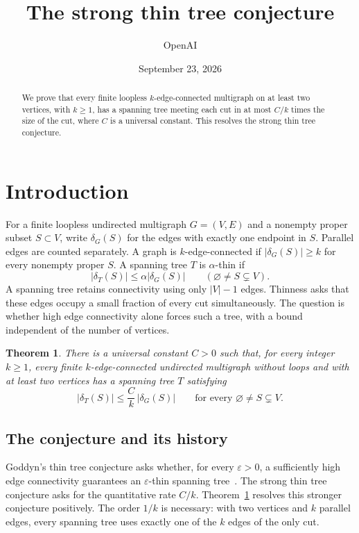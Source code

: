 \documentclass[11pt]{amsart}
\title{The strong thin tree conjecture}
\author{OpenAI}
\date{September 23, 2026}
\newtheorem{theorem}{Theorem}[section]
\theoremstyle{definition}
\theoremstyle{remark}
\numberwithin{equation}{section}
\begin{document}
\begin{abstract}
We prove that every finite loopless \(k\)-edge-connected multigraph on
at least two vertices, with \(k\ge1\), has a spanning tree meeting each
cut in at most \(C/k\) times the size of the cut,
where \(C\) is a universal constant.
This resolves the strong thin tree conjecture.
\end{abstract}
\maketitle
\setcounter{tocdepth}{1}
\tableofcontents
\section{Introduction}\label{sec:introduction}

For a finite loopless undirected multigraph \(G=(V,E)\) and a nonempty proper
subset \(S\subset V\), write \(\delta_G(S)\) for the edges with exactly
one endpoint in \(S\). Parallel edges are counted separately.
A graph is \(k\)-edge-connected if \(|\delta_G(S)|\ge k\) for
every nonempty proper \(S\).
A spanning tree \(T\) is \(\alpha\)-thin if
\[
 |\delta_T(S)|\le\alpha|\delta_G(S)|
 \qquad(\varnothing\ne S\subsetneq V).
\]
A spanning tree retains connectivity using only \(|V|-1\) edges.
Thinness asks that these edges occupy a small fraction of every cut
simultaneously. The question is whether high edge connectivity alone
forces such a tree, with a bound independent of the number of vertices.

\begin{theorem}\label{thm:main}
There is a universal constant \(C>0\) such that, for every integer
\(k\ge1\), every finite \(k\)-edge-connected undirected multigraph
without loops and with at least two vertices has a spanning tree \(T\)
satisfying
\[
 |\delta_T(S)|\le\frac Ck\,|\delta_G(S)|
 \qquad\text{for every }\varnothing\ne S\subsetneq V.
\]
\end{theorem}

\subsection*{The conjecture and its history}

Goddyn's thin tree conjecture asks whether, for every
\(\varepsilon>0\), a sufficiently high edge connectivity guarantees
an \(\varepsilon\)-thin spanning tree~\cite{Goddyn}.
The strong thin tree conjecture asks for the quantitative rate \(C/k\).
Theorem~\ref{thm:main} resolves this stronger conjecture positively.
The order \(1/k\) is necessary: with two vertices and \(k\) parallel
edges, every spanning tree uses exactly one of the \(k\) edges of
the only cut.
\end{document}
